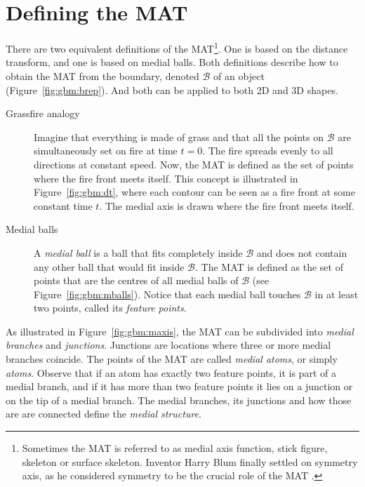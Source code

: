
\section{Defining the MAT}
There are two equivalent definitions of the MAT\footnote{Sometimes the MAT is referred to as medial axis function, stick figure, skeleton or surface skeleton.
Inventor Harry Blum finally settled on symmetry axis, as he considered symmetry to be the crucial role of the MAT \citep{Blum73}.}. 
One is based on the distance transform, and one is based on medial balls. 
Both definitions describe how to obtain the MAT from the boundary, denoted $
\mathcal{B}$ of an object (Figure~\ref{fig:gbm:brep}). 
And both can be applied to both 2D and 3D shapes.

\begin{description}
\item[Grassfire analogy]
Imagine that everything is made of grass and that all the points on $\mathcal{B}$ are simultaneously set on fire at time $t=0$. 
The fire spreads evenly to all directions at constant speed. 
Now, the MAT is defined as the set of points where the fire front meets itself. 
This concept is illustrated in Figure~\ref{fig:gbm:dt}, where each contour can be seen as a fire front at some constant time $t$. The medial axis is drawn where the fire front meets itself.
\item[Medial balls]
A \emph{medial ball} is a ball that fits completely inside $\mathcal{B}$ and does not contain any other ball that would fit inside $\mathcal{B}$. 
The MAT is defined as the set of points that are the centres of all medial balls of $\mathcal{B}$ (see Figure~\ref{fig:gbm:mballs}). 
Notice that each medial ball touches $\mathcal{B}$ in at least two points, called its \emph{feature points}. 
\end{description}

As illustrated in Figure~\ref{fig:gbm:maxis}, the MAT can be subdivided into \emph{medial branches} and \emph{junctions}. 
Junctions are locations where three or more medial branches coincide. 
The points of the MAT are called \emph{medial atoms}, or simply \emph{atoms}. 
Observe that if an atom has exactly two feature points, it is part of a medial branch, and if it has more than two feature points it lies on a junction or on the tip of a medial branch. 
The medial branches, its junctions and how those are are connected define the \emph{medial structure}.

